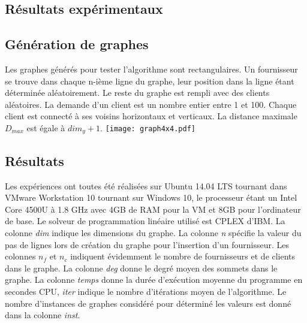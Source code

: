 \documentclass[12pt,a4paper]{article}
\begin{document}
\begin{multicols}{2}
\section{Résultats expérimentaux}
\subsection{Génération de graphes}
Les graphes générés pour tester l'algorithme sont rectangulaires. Un fournisseur se trouve dans chaque n-ième ligne du graphe, leur position dans la ligne étant déterminée aléatoirement. Le reste du graphe est rempli avec des clients aléatoires. La demande d'un client est un nombre entier entre 1 et 100. Chaque client est connecté à ses voisins horizontaux et verticaux. La distance maximale $D_{max}$ est égale à $dim_{y}+1$.
\begingroup
    \centering
    \texttt{[image: graph4x4.pdf]}
    \label{fig:algo}
\endgroup
\subsection{Résultats}
Les expériences ont toutes été réalisées sur Ubuntu 14.04 LTS tournant dans VMware Workstation 10 tournant sur Windows 10, le processeur étant un Intel Core 4500U à 1.8 GHz avec 4GB de RAM pour la VM et 8GB pour l'ordinateur de base. Le solveur de programmation linéaire utilisé est CPLEX d'IBM.
La colonne \textit{dim} indique les dimensions du graphe. La colonne \textit{n} spécifie la valeur du pas de lignes lors de création du graphe pour l'insertion d'un fournisseur. Les colonnes $n_{f}$ et $n_{c}$ indiquent évidemment le nombre de fournisseurs et de clients dans le graphe. La colonne \textit{deg} donne le degré moyen des sommets dans le graphe. La colonne \textit{temps} donne la durée d'exécution moyenne du programme en secondes CPU, \textit{iter} indique le nombre d'itérations moyen de l'algorithme. Le nombre d'instances de graphes considéré pour déterminé les valeurs est donné dans la colonne \textit{inst}.

\end{multicols}
\end{document}
